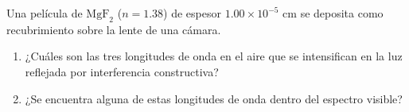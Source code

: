 \item Una película de $\text{MgF}_2$ ($n = 1.38$) de espesor $1.00 \times 10^{-5}\text{ cm}$ se deposita como recubrimiento sobre la lente de una cámara.
\begin{enumerate}
    \item ¿Cuáles son las tres longitudes de onda en el aire que se intensifican en la luz reflejada por interferencia constructiva?
    \item ¿Se encuentra alguna de estas longitudes de onda dentro del espectro visible?
\end{enumerate}